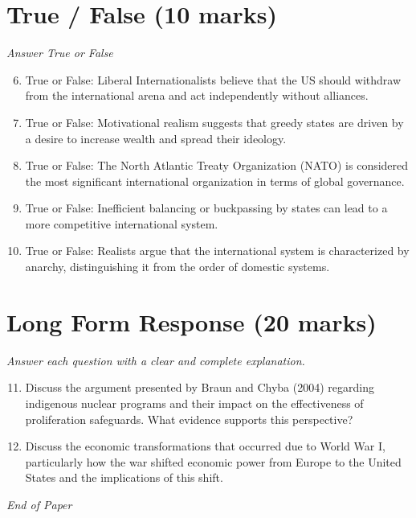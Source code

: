 \documentclass[12pt]{article}
\begin{document}
\section*{True / False (10 marks)}
\textit{Answer True or False}
\begin{enumerate}[label=\arabic*.]
\setcounter{enumi}{5}
\item True or False: Liberal Internationalists believe that the US should withdraw from the international arena and act independently without alliances.
\item True or False: Motivational realism suggests that greedy states are driven by a desire to increase wealth and spread their ideology.
\item True or False: The North Atlantic Treaty Organization (NATO) is considered the most significant international organization in terms of global governance.
\item True or False: Inefficient balancing or buckpassing by states can lead to a more competitive international system.
\item True or False: Realists argue that the international system is characterized by anarchy, distinguishing it from the order of domestic systems.
\end{enumerate}

\section*{Long Form Response (20 marks)}
\textit{Answer each question with a clear and complete explanation.}
\begin{enumerate}[label=\arabic*.]
\setcounter{enumi}{10}
\item Discuss the argument presented by Braun and Chyba (2004) regarding indigenous nuclear programs and their impact on the effectiveness of proliferation safeguards. What evidence supports this perspective?
\item Discuss the economic transformations that occurred due to World War I, particularly how the war shifted economic power from Europe to the United States and the implications of this shift.
\end{enumerate}

\vfill
\noindent\textit{End of Paper}
\end{document}
